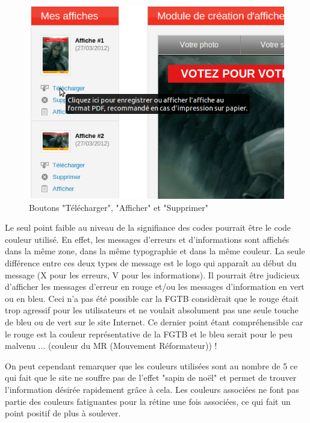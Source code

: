 \documentclass{article}
\begin{document}
\begin{sffamily}
\begin{figure}[h!]
	\begin{center}
		\includegraphics[scale=0.3]{ergo_016.png}
		\caption{Boutons "Télécharger", "Afficher" et "Supprimer"}
	\end{center}
\end{figure}

Le seul point faible au niveau de la signifiance des codes pourrait être le code couleur utilisé. En effet, les messages d'erreurs et 
d'informations sont affichés dans la même zone, dans la même typographie et dans la même couleur. La seule différence entre ces deux types de 
message est le logo qui apparaît au début du message (X pour les erreurs, V pour les informations). Il pourrait être judicieux d'afficher les 
messages d'erreur en rouge et/ou les messages d'information en vert ou en bleu. Ceci n'a pas été possible car la FGTB considèrait que le rouge 
était trop agressif pour les utilisateurs et ne voulait absolument pas une seule touche de bleu ou de vert sur le site Internet. Ce dernier point 
étant compréhensible car le rouge est la couleur représentative de la FGTB et le bleu serait pour le peu malvenu ... (couleur du MR (Mouvement 
Réformateur)) ! \\

\newpage

On peut cependant remarquer que les couleurs utilisées sont au nombre de 5 ce qui fait que le site ne souffre pas de l'effet "sapin de noël" et 
permet de trouver l'information désirée rapidement grâce à cela. Les couleurs associées ne font pas partie des couleurs fatiguantes pour la rétine 
une fois associées, ce qui fait un point positif de plus à soulever.


\end{sffamily}
\end{document}
